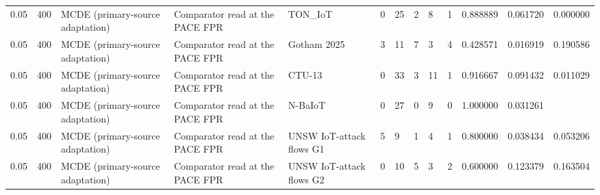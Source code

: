 \begin{tabular}{lllllllllllll}
0.05 & 400 & MCDE (primary-source adaptation) & Comparator read at the PACE FPR & TON\_IoT & 0 & 25 & 2 & 8 & 1 & 0.888889 & 0.061720 & 0.000000 \\
0.05 & 400 & MCDE (primary-source adaptation) & Comparator read at the PACE FPR & Gotham 2025 & 3 & 11 & 7 & 3 & 4 & 0.428571 & 0.016919 & 0.190586 \\
0.05 & 400 & MCDE (primary-source adaptation) & Comparator read at the PACE FPR & CTU-13 & 0 & 33 & 3 & 11 & 1 & 0.916667 & 0.091432 & 0.011029 \\
0.05 & 400 & MCDE (primary-source adaptation) & Comparator read at the PACE FPR & N-BaIoT & 0 & 27 & 0 & 9 & 0 & 1.000000 & 0.031261 &  \\
0.05 & 400 & MCDE (primary-source adaptation) & Comparator read at the PACE FPR & UNSW IoT-attack flows G1 & 5 & 9 & 1 & 4 & 1 & 0.800000 & 0.038434 & 0.053206 \\
0.05 & 400 & MCDE (primary-source adaptation) & Comparator read at the PACE FPR & UNSW IoT-attack flows G2 & 0 & 10 & 5 & 3 & 2 & 0.600000 & 0.123379 & 0.163504 \\
\bottomrule
\end{tabular}
